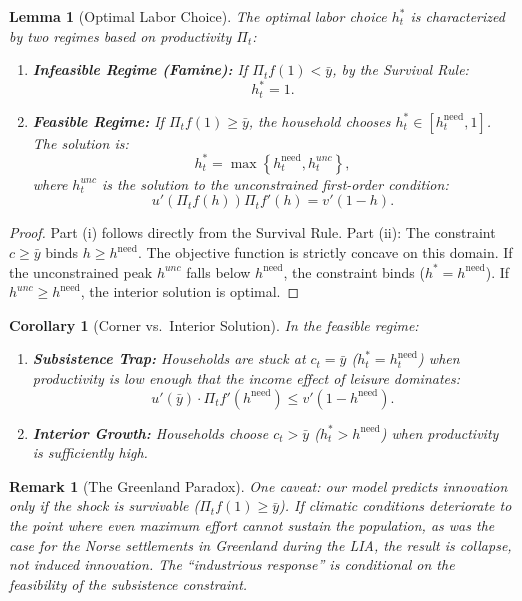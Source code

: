 \documentclass[11pt,a4paper]{article}
\newtheorem{remark}{Remark}
\newtheorem{lemma}{Lemma}
\newtheorem{corollary}{Corollary}
\begin{document}
\begin{lemma}[Optimal Labor Choice]
  \label{lem:corner}
  The optimal labor choice \(h_t^*\) is characterized by two regimes based on productivity \(\Pi_t\):

  \begin{enumerate}
    \item \textbf{Infeasible Regime (Famine):} If \(\Pi_t f(1) < \bar y\), by the Survival Rule:
      \[ h_t^* = 1. \]

    \item \textbf{Feasible Regime:} If \(\Pi_t f(1) \ge \bar y\), the household chooses \(h_t^* \in [h_t^{\text{need}}, 1]\). The solution is:
      \[ h_t^* = \max \left\{ h_t^{\text{need}}, h_t^{unc} \right\}, \]
      where \(h_t^{unc}\) is the solution to the unconstrained first-order condition:
      \[ u'(\Pi_t f(h)) \Pi_t f'(h) = v'(1-h). \]
  \end{enumerate}
\end{lemma}

\begin{proof}
  Part (i) follows directly from the Survival Rule.
  Part (ii): The constraint \(c \ge \bar y\) binds \(h \ge h^{\text{need}}\). The objective function is strictly concave on this domain. If the unconstrained peak \(h^{unc}\) falls below \(h^{\text{need}}\), the constraint binds (\(h^* = h^{\text{need}}\)). If \(h^{unc} \ge h^{\text{need}}\), the interior solution is optimal.
\end{proof}

\begin{corollary}[Corner vs.\ Interior Solution]
  \label{cor:corner}
  In the feasible regime:
  \begin{enumerate}
    \item \textbf{Subsistence Trap:} Households are stuck at \(c_t = \bar{y}\) (\(h_t^* = h_t^{\text{need}}\)) when productivity is low enough that the income effect of leisure dominates:
      \[ u'(\bar y) \cdot \Pi_t f'(h^{\text{need}}) \le v'(1 - h^{\text{need}}). \]
    \item \textbf{Interior Growth:} Households choose \(c_t > \bar{y}\) (\(h_t^* > h^{\text{need}}\)) when productivity is sufficiently high.
  \end{enumerate}
\end{corollary}

\begin{remark}[The Greenland Paradox]
  \label{rem:greenland}
  One caveat: our model predicts innovation only if the shock is survivable (\(\Pi_t f(1) \ge \bar{y}\)). If climatic conditions deteriorate to the point where even maximum effort cannot sustain the population, as was the case for the Norse settlements in Greenland during the LIA, the result is collapse, not induced innovation. The ``industrious response'' is conditional on the feasibility of the subsistence constraint.
\end{remark}
\end{document}
